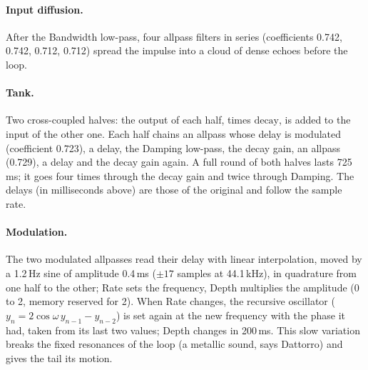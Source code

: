 \documentclass[a4paper,11pt]{article}
\begin{document}
\begin{center}
\end{center}

\paragraph{Input diffusion.} After the Bandwidth low-pass, four allpass filters in series
(coefficients 0.742, 0.742, 0.712, 0.712) spread the impulse into a cloud of dense echoes before
the loop.

\paragraph{Tank.} Two cross-coupled halves: the output of each half, times $\mathrm{decay}$, is
added to the input of the other one. Each half chains an allpass whose delay is modulated
(coefficient 0.723), a delay, the Damping low-pass, the decay gain, an allpass (0.729), a delay
and the decay gain again. A full round of both halves lasts 725\,ms; it goes four times through
the decay gain and twice through Damping. The delays (in milliseconds above) are those of the
original and follow the sample rate.

\paragraph{Modulation.} The two modulated allpasses read their delay with linear interpolation,
moved by a 1.2\,Hz sine of amplitude 0.4\,ms ($\pm 17$ samples at 44.1\,kHz), in quadrature from
one half to the other; Rate sets the frequency, Depth multiplies the amplitude (0 to 2, memory
reserved for 2). When Rate changes, the recursive oscillator ($y_n = 2\cos\omega\, y_{n-1} -
y_{n-2}$) is set again at the new frequency with the phase it had, taken from its last two
values; Depth changes in 200\,ms. This slow variation breaks the fixed resonances of the loop
(a metallic sound, says Dattorro) and gives the tail its motion.
\end{document}
